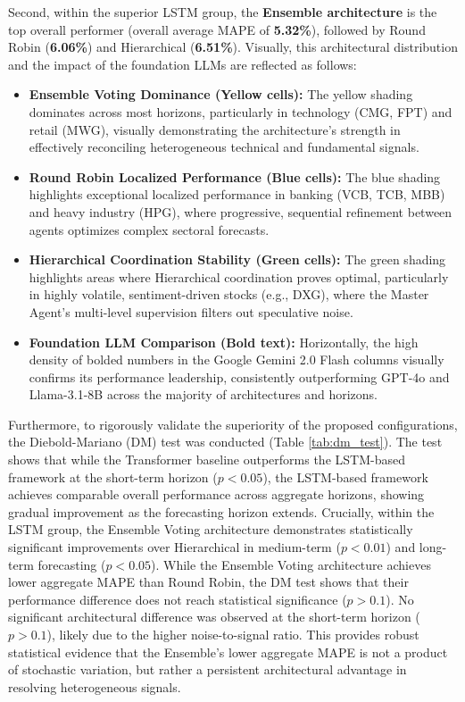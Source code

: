 Second, within the superior LSTM group, the \textbf{Ensemble architecture} is the top overall performer (overall average MAPE of \textbf{5.32\%}), followed by Round Robin (\textbf{6.06\%}) and Hierarchical (\textbf{6.51\%}). Visually, this architectural distribution and the impact of the foundation LLMs are reflected as follows:
\begin{itemize}
    \item \textbf{Ensemble Voting Dominance (Yellow cells):} The yellow shading dominates across most horizons, particularly in technology (CMG, FPT) and retail (MWG), visually demonstrating the architecture's strength in effectively reconciling heterogeneous technical and fundamental signals.
    \item \textbf{Round Robin Localized Performance (Blue cells):} The blue shading highlights exceptional localized performance in banking (VCB, TCB, MBB) and heavy industry (HPG), where progressive, sequential refinement between agents optimizes complex sectoral forecasts.
    \item \textbf{Hierarchical Coordination Stability (Green cells):} The green shading highlights areas where Hierarchical coordination proves optimal, particularly in highly volatile, sentiment-driven stocks (e.g., DXG), where the Master Agent's multi-level supervision filters out speculative noise.
    \item \textbf{Foundation LLM Comparison (Bold text):} Horizontally, the high density of bolded numbers in the Google Gemini 2.0 Flash columns visually confirms its performance leadership, consistently outperforming GPT-4o and Llama-3.1-8B across the majority of architectures and horizons.
\end{itemize}

Furthermore, to rigorously validate the superiority of the proposed configurations, the Diebold-Mariano (DM) test was conducted (Table \ref{tab:dm_test}). The test shows that while the Transformer baseline outperforms the LSTM-based framework at the short-term horizon ($p < 0.05$), the LSTM-based framework achieves comparable overall performance across aggregate horizons, showing gradual improvement as the forecasting horizon extends. Crucially, within the LSTM group, the Ensemble Voting architecture demonstrates statistically significant improvements over Hierarchical in medium-term ($p < 0.01$) and long-term forecasting ($p < 0.05$). While the Ensemble Voting architecture achieves lower aggregate MAPE than Round Robin, the DM test shows that their performance difference does not reach statistical significance ($p > 0.1$). No significant architectural difference was observed at the short-term horizon ($p > 0.1$), likely due to the higher noise-to-signal ratio. This provides robust statistical evidence that the Ensemble's lower aggregate MAPE is not a product of stochastic variation, but rather a persistent architectural advantage in resolving heterogeneous signals.

